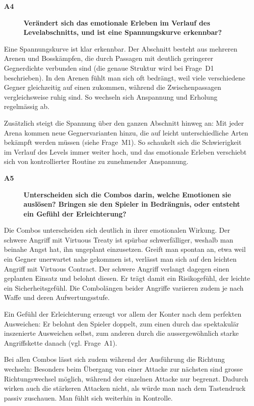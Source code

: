 \documentclass[../Main.tex]{subfiles}
\begin{document}
\begin{description}
    \item[\textbf{A4}] \textbf{Verändert sich das emotionale Erleben im Verlauf des Levelabschnitts, und ist eine Spannungskurve erkennbar?}
\end{description}

Eine Spannungskurve ist klar erkennbar. Der Abschnitt besteht aus mehreren Arenen und Bosskämpfen, die durch Passagen mit deutlich geringerer Gegnerdichte verbunden sind (die genaue Struktur wird bei Frage~D1 beschrieben). In den Arenen fühlt man sich oft bedrängt, weil viele verschiedene Gegner gleichzeitig auf einen zukommen, während die Zwischenpassagen vergleichsweise ruhig sind. So wechseln sich Anspannung und Erholung regelmässig ab.

Zusätzlich steigt die Spannung über den ganzen Abschnitt hinweg an: Mit jeder Arena kommen neue Gegnervarianten hinzu, die auf leicht unterschiedliche Arten bekämpft werden müssen (siehe Frage~M1). So schaukelt sich die Schwierigkeit im Verlauf des Levels immer weiter hoch, und das emotionale Erleben verschiebt sich von kontrollierter Routine zu zunehmender Anspannung.

\begin{description}
    \item[\textbf{A5}] \textbf{Unterscheiden sich die Combos darin, welche Emotionen sie auslösen? Bringen sie den Spieler in Bedrängnis, oder entsteht ein Gefühl der Erleichterung?}
\end{description}

Die Combos unterscheiden sich deutlich in ihrer emotionalen Wirkung. Der schwere Angriff mit Virtuous Treaty ist spürbar schwerfälliger, weshalb man beinahe Angst hat, ihn ungeplant einzusetzen. Greift man spontan an, etwa weil ein Gegner unerwartet nahe gekommen ist, verlässt man sich auf den leichten Angriff mit Virtuous Contract. Der schwere Angriff verlangt dagegen einen geplanten Einsatz und belohnt diesen. Er trägt damit ein Risikogefühl, der leichte ein Sicherheitsgefühl. Die Combolängen beider Angriffe variieren zudem je nach Waffe und deren Aufwertungsstufe.

Ein Gefühl der Erleichterung erzeugt vor allem der Konter nach dem perfekten Ausweichen: Er belohnt den Spieler doppelt, zum einen durch das spektakulär inszenierte Ausweichen selbst, zum anderen durch die aussergewöhnlich starke Angriffskette danach (vgl. Frage~A1).

Bei allen Combos lässt sich zudem während der Ausführung die Richtung wechseln: Besonders beim Übergang von einer Attacke zur nächsten sind grosse Richtungswechsel möglich, während der einzelnen Attacke nur begrenzt. Dadurch wirken auch die stärkeren Attacken nicht, als würde man nach dem Tastendruck passiv zuschauen. Man fühlt sich weiterhin in Kontrolle.
\end{document}
